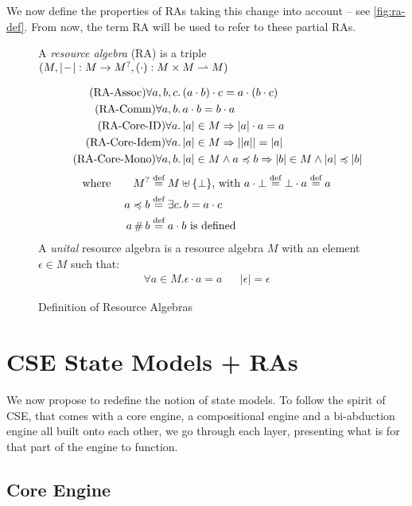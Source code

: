 We now define the properties of RAs taking this change into account -- see \autoref{fig:ra-def}. From now, the term RA will be used to refer to these partial RAs.
\begin{figure}
A \emph{resource algebra} (RA) is a triple $(M, |\!-\!|: M\rightarrow M^?, (\cdot): M\times M \rightharpoonup M)$

\begin{align}
	\tag{RA-Assoc} \forall a,b,c&\ldotp (a\cdot b)\cdot c = a\cdot (b\cdot c)\\
	\tag{RA-Comm} \forall a,b&\ldotp a\cdot b = b\cdot a\\
	\tag{RA-Core-ID} \forall a&\ldotp |a| \in M \Rightarrow |a|\cdot a = a\\
	\tag{RA-Core-Idem} \forall a&\ldotp |a|\in M\Rightarrow ||a|| = |a|\\
	\tag{RA-Core-Mono} \forall a,b&\ldotp |a|\in M\land a\preccurlyeq b \Rightarrow |b| \in M \land |a| \preccurlyeq |b|
\end{align}
\begin{align*}
	\text{where}\qquad
	M^? &\stackrel{\textnormal{def}}= M \uplus \{\bot\}\text{, with }a\cdot \bot \stackrel{\textnormal{def}}= \bot\cdot a\stackrel{\textnormal{def}}= a\\
	a \preccurlyeq b &\stackrel{\textnormal{def}}= \exists c\ldotp b = a\cdot c\\
	a\operatorname{\#} b &\stackrel{\textnormal{def}}= a \cdot b \text{ is defined}
\end{align*}
A \emph{unital} resource algebra is a resource algebra $M$ with an element $\epsilon\in M$ such that:
\begin{align*}
	\forall a\in M. \epsilon\cdot a = a&&
	|\epsilon|=\epsilon
\end{align*}
\caption{Definition of Resource Algebras}
\label{fig:ra-def}
\end{figure}

\section{CSE State Models + RAs}

We now propose to redefine the notion of state models. To follow the spirit of CSE, that comes with a core engine, a compositional engine and a bi-abduction engine all built onto each other, we go through each layer, presenting what is for that part of the engine to function.

\subsection{Core Engine}

